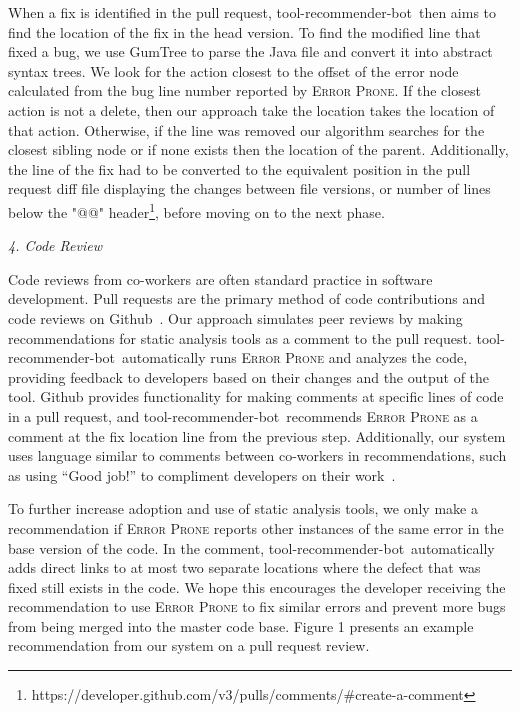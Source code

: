 \documentclass[conference]{IEEEtran}
\newcommand{\tool}{tool-recommender-bot}
\newcommand{\pseudosubsection}[1]{\vspace{2mm} {\it #1}}
\begin{document}
When a fix is identified in the pull request, \tool~then aims to find the location of the fix in the head version. To find the modified line that fixed a bug, we use GumTree to parse the Java file and convert it into abstract syntax trees. We look for the action closest to the offset of the error node calculated from the bug line number reported by \textsc{Error Prone}. If the closest action is not a delete, then our approach take the location takes the location of that action. Otherwise, if the line was removed our algorithm searches for the closest sibling node or if none exists then the location of the parent. Additionally, the line of the fix had to be converted to the equivalent position in the pull request diff file displaying the changes between file versions, or number of lines below the "@@" header\footnote{https://developer.github.com/v3/pulls/comments/\#create-a-comment}, before moving on to the next phase.

\pseudosubsection{4. Code Review}

Code reviews from co-workers are often standard practice in software development. Pull requests are the primary method of code contributions and code reviews on Github~\cite{PullRequestReview}. Our approach simulates peer reviews by making recommendations for static analysis tools as a comment to the pull request. \tool~automatically runs \textsc{Error Prone} and analyzes the code, providing feedback to developers based on their changes and the output of the tool. Github provides functionality for making comments at specific lines of code in a pull request, and \tool~recommends \textsc{Error Prone} as a comment at the fix location line from the previous step. Additionally, our system  uses language similar to comments between co-workers in recommendations, such as using ``Good job!'' to compliment developers on their work~\cite{?}.

To further increase adoption and use of static analysis tools, we only make a recommendation if \textsc{Error Prone} reports other instances of the same error in the base version of the code. In the comment, \tool~automatically adds direct links to at most two separate locations where the defect that was fixed still exists in the code. We hope this encourages the developer receiving the recommendation to use \textsc{Error Prone} to fix similar errors and prevent more bugs from being merged into the master code base. Figure 1 presents an example recommendation from our system on a pull request review.
\end{document}
